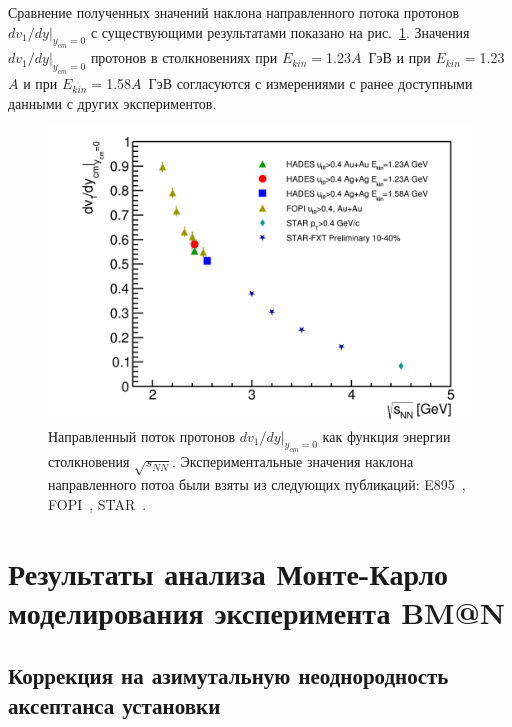 Сравнение полученных значений наклона направленного потока протонов $dv_1/dy|_{y_{cm}=0}$ с существующими результатами показано на рис.~\ref{fig:hades_dv1_dy_sqrt_snn}.
Значения $dv_1/dy|_{y_{cm}=0}$ протонов в столкновениях \au{} при $E_{kin}=$1.23$A$~ГэВ и \ag{} при $E_{kin}=$1.23$A$ и  при $E_{kin}=$1.58$A$~ГэВ согласуются с измерениями с ранее доступными данными с других экспериментов.
%
\begin{figure}[ht]
\begin{center}
\includegraphics[width=0.9\linewidth]{images/dv1_dy_sqrt_snn.png}
\caption{ 
    Направленный поток протонов $dv_1/dy|_{y_{cm}=0}$ как функция энергии столкновения $\sqrt{s_{NN}}$. Экспериментальные значения наклона направленного потоа были взяты из следующих публикаций: E895~\cite{E895:2000maf}, FOPI~\cite{FOPI:2011aa}, STAR~\cite{STAR:2020dav}.
}
\label{fig:hades_dv1_dy_sqrt_snn}
\end{center}
\end{figure}

\section{Результаты анализа Монте-Карло моделирования эксперимента BM@N}

\subsection{Коррекция на азимутальную неоднородность аксептанса установки}

